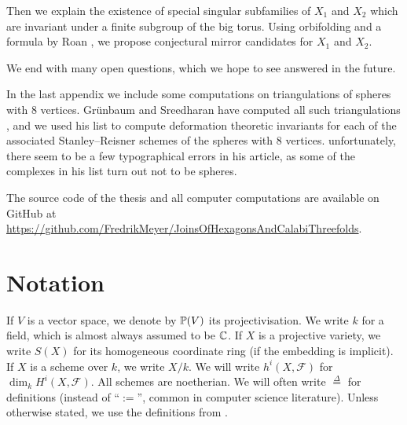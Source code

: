 \begin{itemize}
Then we explain the existence of special singular subfamilies of $X_1$ and $X_2$ which are invariant under a finite subgroup of the big torus. Using {orbifolding} and a formula by Roan \cite{roan_euler}, we propose conjectural mirror candidates for $X_1$ and $X_2$.

We end with many open questions, which we hope to see answered in the future.
\end{itemize}

In the last appendix we include some computations on triangulations of spheres with $8$ vertices. Grünbaum and Sreedharan have computed all such triangulations \cite{grunbaum_enumeration}, and we used his list to compute deformation theoretic invariants for each of the associated Stanley--Reisner schemes of the spheres with $8$ vertices. unfortunately, there seem to be a few typographical errors in his article, as some of the complexes in his list turn out not to be spheres.

The source code of the thesis and all computer computations are available on GitHub at \url{https://github.com/FredrikMeyer/JoinsOfHexagonsAndCalabiThreefolds}.

\section{Notation}

If $V$ is a vector space, we denote by $\P(V)$ its projectivisation. We write $k$ for a field, which is almost always assumed to be $\C$. If $X$ is a projective variety, we write $S(X)$ for its homogeneous coordinate ring (if the embedding is implicit). If $X$ is a scheme over $k$, we write $X/k$. We will write $h^i(X,\mathscr F)$ for $\dim_k H^i(X,\mathscr F)$. All schemes are noetherian. We will often write $\stackrel \Delta = $ for definitions (instead of  ``$:=$'', common in computer science literature). Unless otherwise stated, we use the definitions from \cite{hartshorne}.